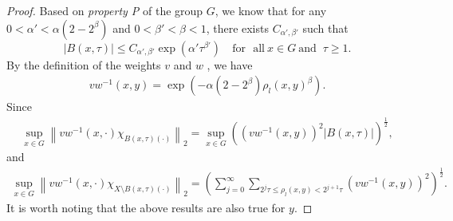 \documentclass[preprint,11pt]{elsarticle}
\numberwithin{equation}{section}
\begin{document}
\begin{proof}
		Based on {\it property P} of the group $G$, we know that for any $0<\alpha'<\alpha(2-2^{\beta})$ and $0<\beta'<\beta<1$, there exists $C_{\alpha' ,\beta' }$ such that
		\[ \left | B(x,\tau) \right | \le C_{\alpha' ,\beta' }\exp(\alpha' \tau^{\beta' })%
		\quad\text{for~ all}~  x\in G~\text{and
		}~\tau\ge1.\]
		By the definition of the weights $v$ and $w$ , we have
		\begin{align}\label{vw}
			vw^{-1}(x,y)=\exp(-\alpha (2-2^{\beta }) \rho_{l}(x,y)^{\beta}).
		\end{align}
		Since 
		\begin{gather}\label{2.7'}
			\sup_{x\in G}\left \| vw^{-1}\left ( x,\cdot \right )\chi _{B\left ( x,\tau  \right )\left ( \cdot  \right )  }  \right \|_{2}=\sup_{x\in G}(  (	vw^{-1}(x,y)    )^{2} \left | B(x,\tau ) \right |)^\frac{1}{2},
		\end{gather}
		and
		\begin{gather}\label{2.7}
			\sup_{x\in G}\left \| vw^{-1}\left ( x,\cdot \right )\chi _{X\setminus B\left ( x,\tau  \right )\left ( \cdot  \right )  }  \right \|_{2}=(\sum_{j=0}^{\infty } \sum _{2^{j}\tau \le\rho_l (x,y)< 2^{j+1}\tau} ( vw^{-1}(x,y)  )^{2})^\frac{1}{2}.
		\end{gather}
		It is worth noting that the above results are also true for $y$.
		

\end{proof}
\end{document}
